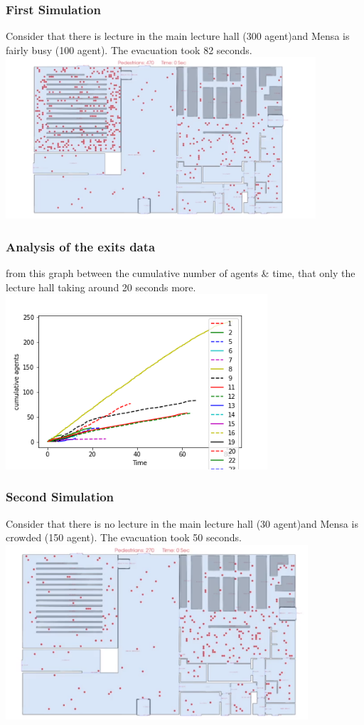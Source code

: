 \documentclass{beamer}
\begin{document}
\begin{frame}
\frametitle{First Simulation}
\raggedright
Consider that there is lecture in the main lecture hall (300 agent)and Mensa is fairly busy (100 agent). The evacuation took 82 seconds.
\centering
  \includegraphics[height=6cm]{01_simulation_start.png}
\end{frame}

\begin{frame}
\frametitle{Analysis of the exits data}
\raggedright
from this graph between the cumulative number of agents \& time, that only the lecture hall taking around 20 seconds more.
\centering
  \includegraphics[height=6.5cm]{results_crowd_01.png}
\end{frame}

\begin{frame}
\frametitle{Second Simulation}
\raggedright
Consider that there is no lecture in the main lecture hall (30 agent)and Mensa is crowded (150 agent). The evacuation took 50 seconds.
\centering
  \includegraphics[height=6.5cm]{02_simulation_start.png}
\end{frame}
\end{document}
